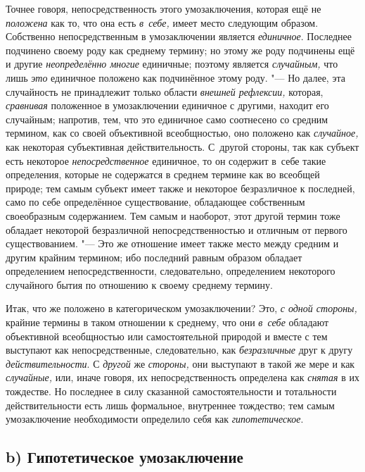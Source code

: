 Точнее говоря, непосредственность этого умозаключения, которая
ещё не {\em положена} как
то, что она есть {\em в~себе,}
имеет место следующим образом. Собственно непосредственным в
умозаключении является {\em единичное}.
Последнее подчинено своему роду как среднему термину; но
этому же роду подчинены ещё и другие
{\em неопределённо многие}
единичные; поэтому является
{\em случайным,} что лишь
{\em это} единичное
положено как подчинённое этому роду. "--- Но далее, эта
случайность не принадлежит только области
{\em внешней рефлексии,}
которая, {\em сравнивая}
положенное в умозаключении единичное с другими, находит его
случайным; напротив, тем, что это единичное само соотнесено со средним
термином, как со своей объективной всеобщностью, оно положено как
{\em случайное,} как
некоторая субъективная действительность. С~другой стороны, так как субъект
есть некоторое {\em непосредственное}
единичное, то он содержит в~себе такие определения, которые
не содержатся в среднем термине как во всеобщей природе; тем самым субъект
имеет также и некоторое безразличное к последней, само по себе определённое
существование, обладающее собственным своеобразным
содержанием. Тем самым и наоборот, этот другой
термин
тоже обладает некоторой безразличной непосредственностью и
отличным от первого существованием. "--- Это же отношение имеет
также место между средним и другим крайним термином; ибо последний равным
образом обладает определением непосредственности, следовательно,
определением некоторого случайного бытия по отношению к своему среднему
термину.

Итак, что же положено в категорическом умозаключении? Это,
{\em с одной стороны,}
крайние термины в таком отношении к среднему, что они
{\em в~себе} обладают
объективной всеобщностью или самостоятельной природой и вместе с тем
выступают как непосредственные, следовательно, как
{\em безразличные} друг к
другу {\em действительности}.
С {\em другой}
же {\em стороны,}
они выступают в такой же мере и как
{\em случайные,} или,
иначе говоря, их непосредственность определена как
{\em снятая} в их
тождестве. Но последнее в силу сказанной самостоятельности и тотальности
действительности есть лишь формальное, внутреннее тождество; тем самым
умозаключение необходимости определило себя как
{\em гипотетическое}.

\subsection[b) Гипотетическое умозаключение]{b) Гипотетическое умозаключение}

